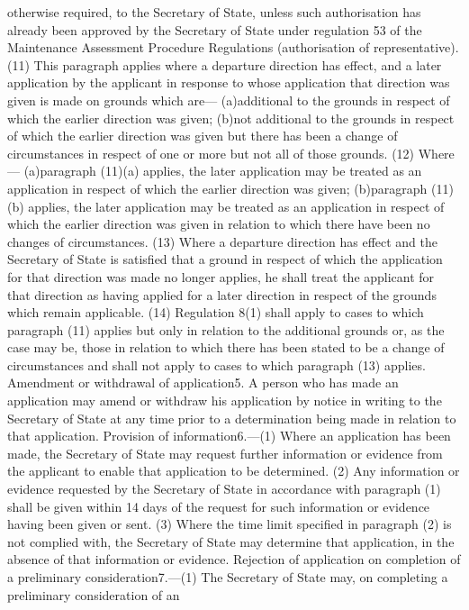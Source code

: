 \documentclass[a4paper]{article}
\begin{document}
otherwise required, to the Secretary of State, unless such authorisation has
already been approved by the Secretary of State under regulation 53 of the
Maintenance Assessment Procedure Regulations (authorisation of representative).
(11) This paragraph applies where a departure direction has effect, and a later
application by the applicant in response to whose application that direction was
given is made on grounds which are—
(a)additional to the grounds in respect of which the earlier direction was
given;
(b)not additional to the grounds in respect of which the earlier direction was
given but there has been a change of circumstances in respect of one or more but
not all of those grounds.
(12) Where—
(a)paragraph (11)(a) applies, the later application may be treated as an
application in respect of which the earlier direction was given;
(b)paragraph (11)(b) applies, the later application may be treated as an
application in respect of which the earlier direction was given in relation to
which there have been no changes of circumstances.
(13) Where a departure direction has effect and the Secretary of State is
satisfied that a ground in respect of which the application for that direction
was made no longer applies, he shall treat the applicant for that direction as
having applied for a later direction in respect of the grounds which remain
applicable.
(14) Regulation 8(1) shall apply to cases to which paragraph (11) applies but
only in relation to the additional grounds or, as the case may be, those in
relation to which there has been stated to be a change of circumstances and
shall not apply to cases to which paragraph (13) applies.
Amendment or withdrawal of application5. A person who has made an application
may amend or withdraw his application by notice in writing to the Secretary of
State at any time prior to a determination being made in relation to that
application.
Provision of information6.—(1) Where an application has been made, the Secretary
of State may request further information or evidence from the applicant to
enable that application to be determined.
(2) Any information or evidence requested by the Secretary of State in
accordance with paragraph (1) shall be given within 14 days of the request for
such information or evidence having been given or sent.
(3) Where the time limit specified in paragraph (2) is not complied with, the
Secretary of State may determine that application, in the absence of that
information or evidence.
Rejection of application on completion of a preliminary consideration7.—(1) The
Secretary of State may, on completing a preliminary consideration of an
\end{document}
